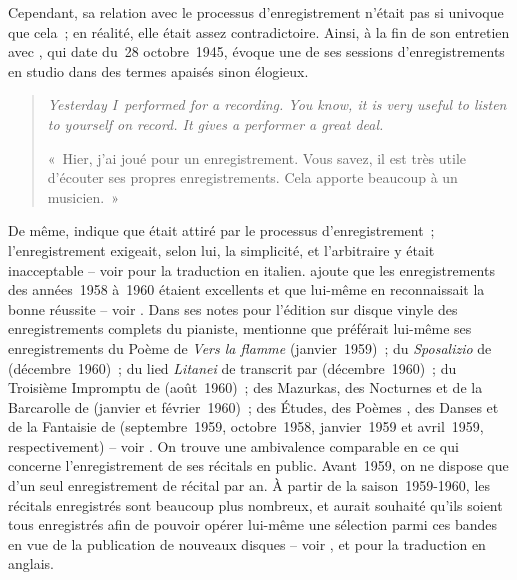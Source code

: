 Cependant, sa relation avec le processus d'enregistrement n'était pas si
univoque que cela~; en réalité, elle était assez contradictoire.
Ainsi, à la fin de son entretien avec \citet{Vitsinsky}, qui date du~28
octobre~1945, \VSofronitsky{} évoque une de ses sessions d'enregistrements
en studio dans des termes apaisés sinon élogieux.

\begin{quotation}
 \foreignlanguage{english}{\emph{%
  Yesterday I~performed for a recording.
  You know, it is very useful to listen to yourself on record.
  It gives a performer a great deal.}}

 «~Hier, j'ai joué pour un enregistrement.
 Vous savez, il est très utile d'écouter ses propres enregistrements.
 Cela apporte beaucoup à un musicien.~»%
\end{quotation}

De même, \citet{Nikonovich08b} indique que \VSofronitsky{} était attiré par
le processus d'enregistrement~; l'enregistrement exigeait, selon lui, la
simplicité, et l'arbitraire y était inacceptable -- voir
\citet[p.~567]{Voskobojnikov09b} pour la traduction en italien.
\citet{Nikonovich08b} ajoute que les enregistrements des années~1958 à~1960
étaient excellents et que \VSofronitsky{} lui-même en reconnaissait la bonne
réussite -- voir \citet[p.~567]{Voskobojnikov09b}.
Dans ses notes pour l'édition sur disque vinyle des enregistrements complets
du pianiste, \citet{Nikonovich79} mentionne que \VSofronitsky{} préférait
lui-même ses enregistrements du Poème de \Scriabine{} \emph{Vers la flamme}
(janvier~1959)~; du \emph{Sposalizio} de \Liszt{} (décembre~1960)~; du lied
\emph{Litanei} de \Schubert{} transcrit par \Liszt{} (décembre~1960)~; du
Troisième Impromptu de \Schubert{} (août~1960)~; des Mazurkas, des Nocturnes
et de la Barcarolle de \Chopin{} (janvier et février~1960)~; des Études, des
Poèmes , des Danses  et de la Fantaisie  de
\Scriabine{} (septembre~1959, octobre~1958, janvier~1959 et avril~1959,
respectivement) -- voir \citet[p.~20]{White}.
On trouve une ambivalence comparable en ce qui concerne l'enregistrement de
ses récitals en public.
Avant~1959, on ne dispose que d'un seul enregistrement de récital par an.
À partir de la saison~1959-1960, les récitals enregistrés sont beaucoup plus
nombreux, et \VSofronitsky{} aurait souhaité qu'ils soient tous enregistrés
afin de pouvoir opérer lui-même une sélection parmi ces bandes en vue de la
publication de nouveaux disques -- voir \citet{Nikonovich79}, et
\citet[p.~20]{White} pour la traduction en anglais.

